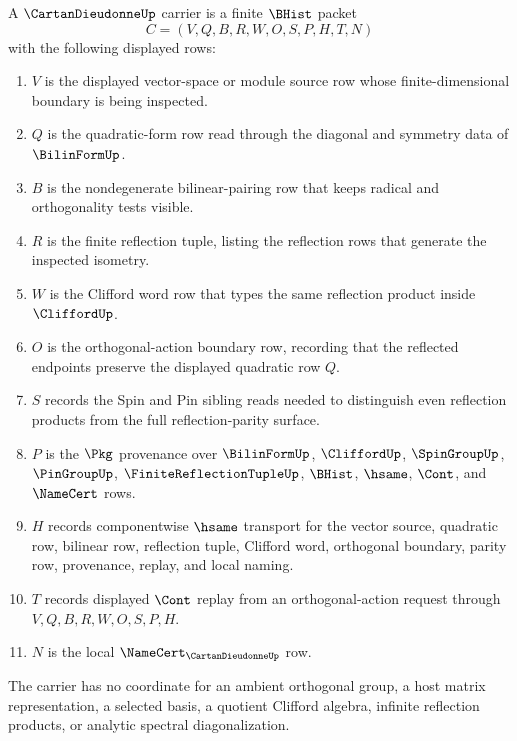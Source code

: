 \begin{definition}
\label{def:cartan-dieudonne-carrier}
A $\CartanDieudonneUp$ carrier is a finite $\BHist$ packet
$$
C=(V,Q,B,R,W,O,S,P,H,T,N)
$$
with the following displayed rows:
\begin{enumerate}
\item $V$ is the displayed vector-space or module source row whose finite-dimensional boundary is being inspected.
\item $Q$ is the quadratic-form row read through the diagonal and symmetry data of $\BilinFormUp$.
\item $B$ is the nondegenerate bilinear-pairing row that keeps radical and orthogonality tests visible.
\item $R$ is the finite reflection tuple, listing the reflection rows that generate the inspected isometry.
\item $W$ is the Clifford word row that types the same reflection product inside $\CliffordUp$.
\item $O$ is the orthogonal-action boundary row, recording that the reflected endpoints preserve the displayed quadratic row $Q$.
\item $S$ records the Spin and Pin sibling reads needed to distinguish even reflection products from the full reflection-parity surface.
\item $P$ is the $\Pkg$ provenance over $\BilinFormUp$, $\CliffordUp$, $\SpinGroupUp$, $\PinGroupUp$, $\FiniteReflectionTupleUp$, $\BHist$, $\hsame$, $\Cont$, and $\NameCert$ rows.
\item $H$ records componentwise $\hsame$ transport for the vector source, quadratic row, bilinear row, reflection tuple, Clifford word, orthogonal boundary, parity row, provenance, replay, and local naming.
\item $T$ records displayed $\Cont$ replay from an orthogonal-action request through $V,Q,B,R,W,O,S,P,H$.
\item $N$ is the local $\NameCert_{\CartanDieudonneUp}$ row.
\end{enumerate}
The carrier has no coordinate for an ambient orthogonal group, a host matrix representation, a selected basis, a quotient Clifford algebra, infinite reflection products, or analytic spectral diagonalization.
\end{definition}

